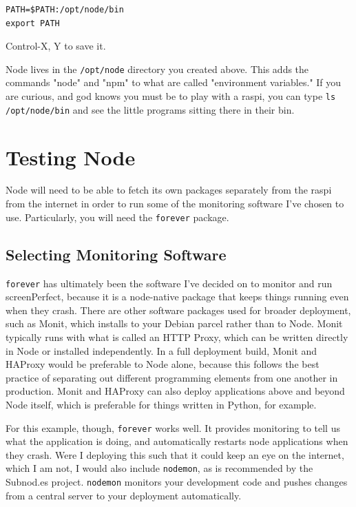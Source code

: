 \begin{lstlisting}
PATH=$PATH:/opt/node/bin 
export PATH
\end{lstlisting}

Control-X, Y to save it.

Node lives in the \texttt{/opt/node} directory you created above. This adds the commands "node" and "npm" to what are called "environment variables." If you are curious, and god knows you must be to play with a raspi, you can type \texttt{ls /opt/node/bin} and see the little programs sitting there in their bin.

\section{Testing Node}
Node will need to be able to fetch its own packages separately from the raspi from the internet in order to run some of the monitoring software I've chosen to use. Particularly, you will need the \texttt{forever} package.

\subsection{Selecting Monitoring Software}
\texttt{forever} has ultimately been the software I've decided on to monitor and run screenPerfect, because it is a node-native package that keeps things running even when they crash. There are other software packages used for broader deployment, such as Monit, which installs to your Debian parcel rather than to Node. Monit typically runs with what is called an HTTP Proxy, which can be written directly in Node or installed independently. In a full deployment build, Monit and HAProxy would be preferable to Node alone, because this follows the best practice of separating out different programming elements from one another in production. Monit and HAProxy can also deploy applications above and beyond Node itself, which is preferable for things written in Python, for example. 

For this example, though, \texttt{forever} works well. It provides monitoring to tell us what the application is doing, and automatically restarts node applications when they crash. Were I deploying this such that it could keep an eye on the internet, which I am not, I would also include \texttt{nodemon}, as is recommended by the Subnod.es project. \texttt{nodemon} monitors your development code and pushes changes from a central server to your deployment automatically.

